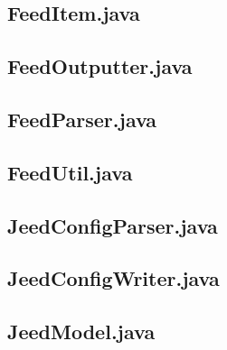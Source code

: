 \documentclass[a4paper, 12pt]{article}
\begin{document}
\newpage
\subsection{FeedItem.java}\label{FeedItem.java}
\begin{footnotesize}
  
\end{footnotesize}

\newpage
\subsection{FeedOutputter.java}\label{FeedOutputter.java}
\begin{footnotesize}
  
\end{footnotesize}

\newpage
\subsection{FeedParser.java}\label{FeedParser.java}
\begin{footnotesize}
  
\end{footnotesize}

\newpage
\subsection{FeedUtil.java}\label{FeedUtil.java}
\begin{footnotesize}
  
\end{footnotesize}

\newpage
\subsection{JeedConfigParser.java}\label{JeedConfigParser.java}
\begin{footnotesize}
  
\end{footnotesize}

\newpage
\subsection{JeedConfigWriter.java}\label{JeedConfigWriter.java}
\begin{footnotesize}
  
\end{footnotesize}

\newpage
\subsection{JeedModel.java}\label{JeedModel.java}
\begin{footnotesize}
  
\end{footnotesize}
\end{document}
